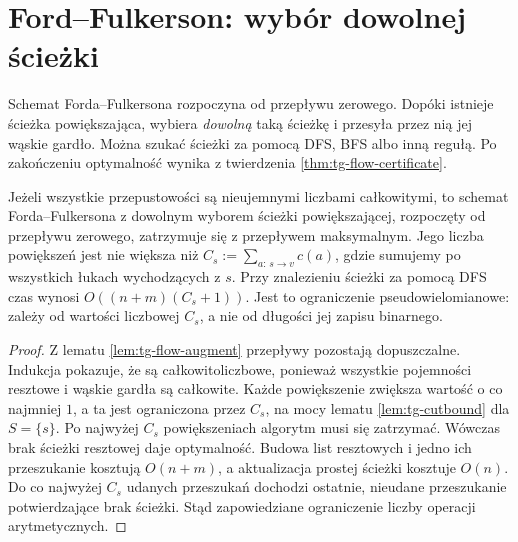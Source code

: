 \section{Ford--Fulkerson: wybór dowolnej ścieżki}
\label{sec:tg-flow-ff}

Schemat Forda--Fulkersona rozpoczyna od
przepływu zerowego. Dopóki istnieje ścieżka
powiększająca, wybiera \emph{dowolną} taką
ścieżkę i przesyła przez nią jej wąskie gardło.
Można szukać ścieżki za pomocą DFS, BFS
albo inną regułą. Po zakończeniu optymalność
wynika z twierdzenia \ref{thm:tg-flow-certificate}.

\begin{twierdzenie}
\label{thm:tg-flow-ff-integer}
Jeżeli wszystkie przepustowości są nieujemnymi
liczbami całkowitymi, to schemat Forda--Fulkersona
z dowolnym wyborem ścieżki powiększającej,
rozpoczęty od przepływu zerowego,
zatrzymuje się z przepływem maksymalnym.
Jego liczba powiększeń jest nie większa niż
$C_s:=\sum_{a:\,s\to v}c(a)$, gdzie sumujemy
po wszystkich łukach wychodzących z $s$.
Przy znalezieniu ścieżki za pomocą DFS
czas wynosi $O((n+m)(C_s+1))$.
Jest to ograniczenie pseudowielomianowe:
zależy od wartości liczbowej $C_s$, a nie od
długości jej zapisu binarnego.
\end{twierdzenie}
\begin{proof}
Z lematu \ref{lem:tg-flow-augment} przepływy
pozostają dopuszczalne. Indukcja pokazuje, że
są całkowitoliczbowe, ponieważ wszystkie
pojemności resztowe i wąskie gardła
są całkowite. Każde powiększenie zwiększa
wartość o co najmniej $1$, a ta jest
ograniczona przez $C_s$, na mocy
lematu \ref{lem:tg-cutbound} dla $S=\{s\}$.
Po najwyżej $C_s$ powiększeniach algorytm
musi się zatrzymać. Wówczas brak ścieżki
resztowej daje optymalność.
Budowa list resztowych i jedno ich przeszukanie
kosztują $O(n+m)$, a aktualizacja prostej ścieżki
kosztuje $O(n)$. Do co najwyżej $C_s$ udanych
przeszukań dochodzi ostatnie, nieudane przeszukanie
potwierdzające brak ścieżki. Stąd zapowiedziane
ograniczenie liczby operacji arytmetycznych.
\end{proof}

